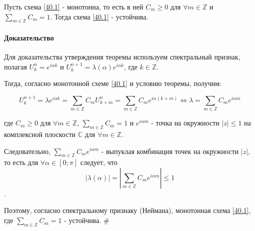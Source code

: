 \documentclass[__main__.tex]{subfiles}
\begin{document}
Пусть схема \ref{40.1} - монотонна, то есть в ней $C_m \geq 0$ для $\forall m \in \mathbb{Z}$ и $\sum_{m\in \mathbb{Z}} C_m = 1$. Тогда схема \ref{40.1} - устойчива.

\paragraph{Доказательство}

Для доказательства утверждения теоремы используем спектральный признак, полагая $U^n_k = e^{i \alpha k}$ и $U^{n+1}_k = \lambda \left(\alpha \right) e^{i\alpha k}$, где $k \in \mathbb{Z}$.

Тогда, согласно монотонной схеме \ref{40.1} и условию теоремы, получим:

$$
U^{n+1}_k = \lambda e^{i\alpha k} = \sum_{m\in \mathbb{Z}} C_m U^n_{k+m} = \sum_{m\in \mathbb{Z}} C_m e^{i\alpha \left(k+m\right)} \Leftrightarrow \lambda = \sum_{m\in \mathbb{Z}} C_m e^{i\alpha m}
$$

где $C_m \geq 0$ для $\forall m \in \mathbb{Z}$, $\sum_{m\in \mathbb{Z}} C_m = 1$ и $e^{i\alpha m}$ - точка на окружности $\left| z \right| \leq 1$ на комплексной плоскости $\mathbb{C}$ для $\forall m \in \mathbb{Z}$.

Следовательно, $\sum_{m\in \mathbb{Z}} C_m e^{i \alpha m}$ - выпуклая комбинация точек на окружности $\left|z\right|$, то есть для $\forall \alpha \in \left[ 0;\pi \right]$ следует, что $$\left|\lambda\left(\alpha\right)\right| = \left|\sum_{m\in \mathbb{Z}} C_m e^{i \alpha m}\right| \leq 1$$.

Поэтому, согласно спектральному признаку (Неймана), монотонная схема \ref{40.1}, где $\sum_{m\in \mathbb{Z}} C_m = 1$ - устойчива. $\#$
\end{document}
